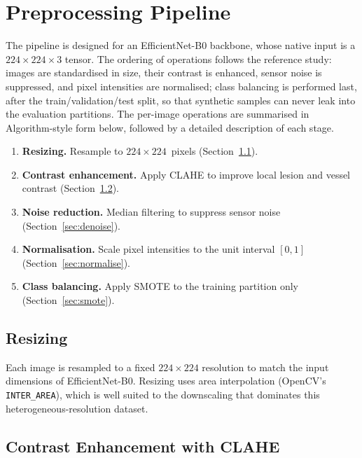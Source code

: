 \documentclass[11pt,a4paper]{article}
\begin{document}
\section{Preprocessing Pipeline}
\label{sec:pipeline}

The pipeline is designed for an EfficientNet-B0 backbone, whose native input
is a $224\times224\times3$ tensor. The ordering of operations follows the
reference study: images are standardised in size, their contrast is enhanced,
sensor noise is suppressed, and pixel intensities are normalised; class
balancing is performed last, after the train/validation/test split, so that
synthetic samples can never leak into the evaluation partitions. The per-image
operations are summarised in Algorithm-style form below, followed by a detailed
description of each stage.

\begin{enumerate}
  \item \textbf{Resizing.} Resample to $224\times224$~pixels
        (Section~\ref{sec:resize}).
  \item \textbf{Contrast enhancement.} Apply CLAHE to improve local lesion and
        vessel contrast (Section~\ref{sec:clahe}).
  \item \textbf{Noise reduction.} Median filtering to suppress sensor noise
        (Section~\ref{sec:denoise}).
  \item \textbf{Normalisation.} Scale pixel intensities to the unit interval
        $[0,1]$ (Section~\ref{sec:normalise}).
  \item \textbf{Class balancing.} Apply SMOTE to the training partition only
        (Section~\ref{sec:smote}).
\end{enumerate}

\subsection{Resizing}
\label{sec:resize}

Each image is resampled to a fixed $224\times224$ resolution to match the input
dimensions of EfficientNet-B0. Resizing uses area interpolation (OpenCV's
\texttt{INTER\_AREA}), which is well suited to the downscaling that dominates
this heterogeneous-resolution dataset.

\subsection{Contrast Enhancement with CLAHE}
\label{sec:clahe}
\end{document}

